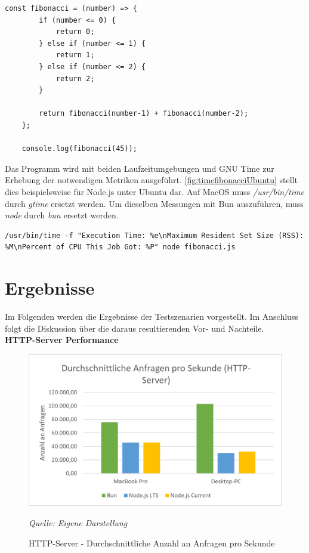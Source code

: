 \begin{lstlisting}[caption={[Berechnung der Fibonacci-Folge]Berechnung der Fibonacci-Folge\\\textit{Quelle: Eigene Darstellung}},label={fig:fibonacci}]
	const fibonacci = (number) => {
		if (number <= 0) {
			return 0;
		} else if (number <= 1) {
			return 1;
		} else if (number <= 2) {
			return 2;
		}
		
		return fibonacci(number-1) + fibonacci(number-2);
	};
	
	console.log(fibonacci(45));
\end{lstlisting}

\noindent
Das Programm wird mit beiden Laufzeitumgebungen und GNU Time zur Erhebung der notwendigen Metriken ausgeführt. \autoref{fig:timefibonacciUbuntu} stellt dies beispielsweise für Node.js unter Ubuntu dar. Auf MacOS muss \textit{/usr/bin/time} durch \textit{gtime} ersetzt werden. Um dieselben Messungen mit Bun auszuführen, muss \textit{node} durch \textit{bun} ersetzt werden.
\begin{lstlisting}[caption={[Messung der Fibonacci-Folge auf dem Desktop-PC]Messung der Fibonacci-Folge auf dem Desktop-PC\\\textit{Quelle: Eigene Darstellung}},label={fig:timefibonacciUbuntu}]
	/usr/bin/time -f "Execution Time: %e\nMaximum Resident Set Size (RSS): %M\nPercent of CPU This Job Got: %P" node fibonacci.js
\end{lstlisting}



\section{Ergebnisse} \label{sec:performance-results}
Im Folgenden werden die Ergebnisse der Testszenarien vorgestellt. Im Anschluss folgt die Diskussion über die daraus resultierenden Vor- und Nachteile.\\

\noindent
\textbf{HTTP-Server Performance}
\begin{figure}[h!]
	\centering
	\includegraphics[width=\linewidth]{./images/httpServerAverageRequestsPerSecond.png}
	\caption{HTTP-Server - Durchschnittliche Anzahl an Anfragen pro Sekunde}
	\label{fig:httpServerAverageRequestsPerSecond}
	\textit{Quelle: Eigene Darstellung}
\end{figure}


